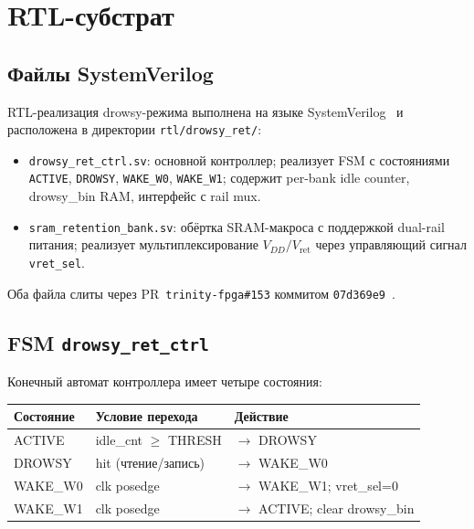 \section{RTL-субстрат}
\label{sec:glava89-rtl}

\subsection{Файлы SystemVerilog}

RTL-реализация drowsy-режима выполнена на языке SystemVerilog~\cite{IEEE-SV-1800-2017}
и расположена в директории \texttt{rtl/drowsy\_ret/}:
%
\begin{itemize}
  \item \texttt{drowsy\_ret\_ctrl.sv}:
        основной контроллер; реализует FSM с состояниями
        \texttt{ACTIVE}, \texttt{DROWSY}, \texttt{WAKE\_W0}, \texttt{WAKE\_W1};
        содержит per-bank idle counter, drowsy\_bin RAM,
        интерфейс с rail mux.
  \item \texttt{sram\_retention\_bank.sv}:
        обёртка SRAM-макроса с поддержкой dual-rail питания;
        реализует мультиплексирование $V_{DD}/V_\mathrm{ret}$
        через управляющий сигнал \texttt{vret\_sel}.
\end{itemize}
%
Оба файла слиты через PR~\texttt{trinity-fpga\#153}
коммитом \texttt{07d369e9}~\cite{trinityfpga153}.

\subsection{FSM \texttt{drowsy\_ret\_ctrl}}

Конечный автомат контроллера имеет четыре состояния:
%
\begin{center}
\begin{tabular}{|l|l|l|}
  \hline
  \textbf{Состояние} & \textbf{Условие перехода} & \textbf{Действие} \\
  \hline
  ACTIVE & idle\_cnt $\geq$ THRESH & $\to$ DROWSY \\
  DROWSY & hit (чтение/запись) & $\to$ WAKE\_W0 \\
  WAKE\_W0 & clk posedge & $\to$ WAKE\_W1; vret\_sel=0 \\
  WAKE\_W1 & clk posedge & $\to$ ACTIVE; clear drowsy\_bin \\
  \hline
\end{tabular}
\end{center}

